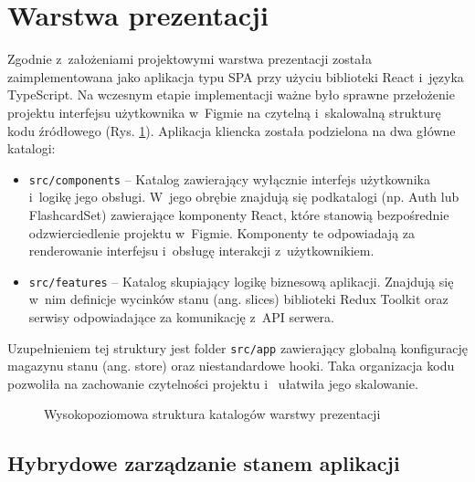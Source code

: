 \section{Warstwa prezentacji}
Zgodnie z~założeniami projektowymi warstwa prezentacji została zaimplementowana jako aplikacja 
typu SPA przy użyciu biblioteki React i~języka TypeScript. Na wczesnym etapie implementacji ważne 
było sprawne przełożenie projektu interfejsu użytkownika w~Figmie na czytelną i~skalowalną strukturę 
kodu źródłowego (Rys. \ref{fig:frontend_structure}). Aplikacja kliencka została podzielona na dwa główne 
katalogi:
\begin{itemize}
    \item \texttt{src/components} -- Katalog zawierający wyłącznie interfejs użytkownika i~logikę jego obsługi.
    W~jego obrębie znajdują się podkatalogi (np. Auth lub FlashcardSet) zawierające komponenty React, które 
    stanowią bezpośrednie odzwierciedlenie projektu w~Figmie. Komponenty te odpowiadają za renderowanie interfejsu 
    i~obsługę interakcji z~użytkownikiem.
    \item \texttt{src/features} -- Katalog skupiający logikę biznesową aplikacji. Znajdują się w~nim definicje wycinków stanu
    (ang. slices) biblioteki Redux Toolkit oraz serwisy odpowiadające za komunikację z~API serwera.
\end{itemize} 
Uzupełnieniem tej struktury jest folder \texttt{src/app} zawierający globalną konfigurację magazynu stanu (ang. store) 
oraz niestandardowe hooki. Taka organizacja kodu pozwoliła na zachowanie czytelności projektu i~
ułatwiła jego skalowanie. 

\begin{figure}[h]
    \centering
    \begin{minipage}{0.25\textwidth} 
    \end{minipage}
    \caption{Wysokopoziomowa struktura katalogów warstwy prezentacji}
    \label{fig:frontend_structure}
\end{figure}

\subsection{Hybrydowe zarządzanie stanem aplikacji}


